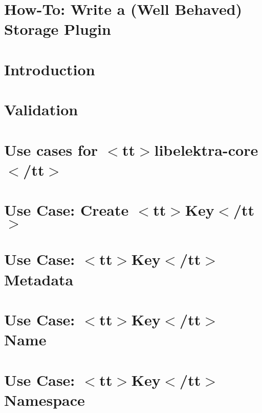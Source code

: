 \let\mypdfximage\pdfximage\def\pdfximage{\immediate\mypdfximage}\documentclass[twoside]{book}
\newcommand{\+}{\discretionary{\mbox{\scriptsize$\hookleftarrow$}}{}{}}
\begin{document}
\chapter{How-\/\+To\+: Write a (Well Behaved) Storage Plugin}
\label{doc_tutorials_storage-plugins_md}

\chapter{Introduction}
\label{doc_tutorials_using_podman_instead_of_docker_md}

\chapter{Validation}
\label{doc_tutorials_validation_md}

\chapter{Use cases for $<$tt$>$libelektra-\/core$<$/tt$>$}
\label{doc_usecases_core_README_md}

\chapter{Use Case\+: Create $<$tt$>$Key$<$/tt$>$}
\label{doc_usecases_core_UC_key_create_md}

\chapter{Use Case\+: $<$tt$>$Key$<$/tt$>$ Metadata}
\label{doc_usecases_core_UC_key_meta_md}

\chapter{Use Case\+: $<$tt$>$Key$<$/tt$>$ Name}
\label{doc_usecases_core_UC_key_name_md}

\chapter{Use Case\+: $<$tt$>$Key$<$/tt$>$ Namespace}
\label{doc_usecases_core_UC_key_namespace_md}

\end{document}
